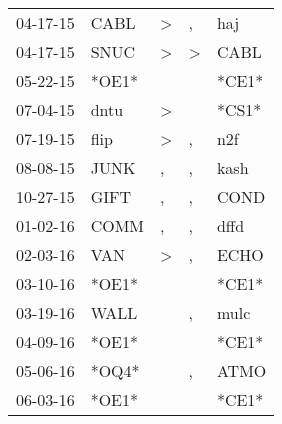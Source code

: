 \begin{supertabular}{p{0.07\textwidth}p{0.06\textwidth}p{0.02\textwidth}p{0.02\textwidth}p{0.06\textwidth}}
          04-17-15\textsuperscript{} &           CABL\textsuperscript{} &     \textgreater &                , &            haj\textsuperscript{} \\
          04-17-15\textsuperscript{} &           SNUC\textsuperscript{} &     \textgreater &     \textgreater &           CABL\textsuperscript{} \\
          05-22-15\textsuperscript{} &                            *OE1* &                  &                  &                            *CE1* \\
          07-04-15\textsuperscript{} &           dntu\textsuperscript{} &     \textgreater &                  &                            *CS1* \\
          07-19-15\textsuperscript{} &           flip\textsuperscript{} &     \textgreater &                , &            n2f\textsuperscript{} \\
          08-08-15\textsuperscript{} &           JUNK\textsuperscript{} &                , &                , &           kash\textsuperscript{} \\
          10-27-15\textsuperscript{} &           GIFT\textsuperscript{} &                , &                , &           COND\textsuperscript{} \\
          01-02-16\textsuperscript{} &           COMM\textsuperscript{} &                , &                , &           dffd\textsuperscript{} \\
          02-03-16\textsuperscript{} &            VAN\textsuperscript{} &     \textgreater &                , &           ECHO\textsuperscript{} \\
          03-10-16\textsuperscript{} &                            *OE1* &                  &                  &                            *CE1* \\
          03-19-16\textsuperscript{} &           WALL\textsuperscript{} &                  &                , &           mulc\textsuperscript{} \\
          04-09-16\textsuperscript{} &                            *OE1* &                  &                  &                            *CE1* \\
          05-06-16\textsuperscript{} &                            *OQ4* &                  &                , &           ATMO\textsuperscript{} \\
          06-03-16\textsuperscript{} &                            *OE1* &                  &                  &                            *CE1* \\

\end{supertabular}
